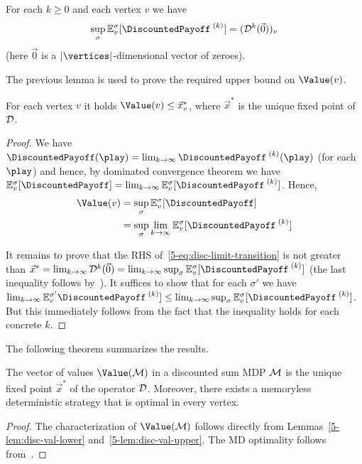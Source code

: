 \begin{lemma}
\label{5-lem:disc-iterates}
For each $k\geq 0$ and each vertex $v$ we have 
$$\sup_{\sigma}\expv^{\sigma}_{v}[\dPayoffStep{k}] = 
(\discOP^k(\vec{0}))_v$$ 
(here $\vec{0}$ is a $|\vertices|$-dimensional vector of zeroes).
\end{lemma}

The previous lemma is used to prove the required upper bound on $\Value(v)$.

\begin{lemma}
\label{5-lem:disc-val-upper}
For each vertex $v$ it holds 
$\Value(v)\leq \vec{x}^*_v$, where $\vec{x}^*$ is the 
unique fixed point of $\mathcal{D}$.
\end{lemma}
\begin{proof}
%
We have $\DiscountedPayoff(\play) = \lim_{k\rightarrow 
\infty}\dPayoffStep{k}(\play)$ (for each $\play$) and hence, by 
dominated 
convergence theorem we have $\expv^\sigma_v[\DiscountedPayoff] = 
\lim_{k\rightarrow 
\infty}\expv^\sigma_v[\dPayoffStep{k}]$. 
Hence,
%
\begin{align}
\Value(v) &= \sup_{\sigma}\expv^\sigma_v[\DiscountedPayoff] \nonumber\\
&= \sup_{\sigma}\lim_{k\rightarrow \infty}\expv^\sigma_v[\dPayoffStep{k}] 
\label{5-eq:disc-limit-transition}
\end{align}

\noindent
It remains to prove that the RHS of~\cref{5-eq:disc-limit-transition} is not 
greater than $\vec{x}^*= \lim_{k\rightarrow 
\infty}\discOP^k(\vec{0})=\lim_{k\rightarrow \infty} 
\sup_{\sigma}\expv^\sigma_v[\dPayoffStep{k}]$ (the last inequality follows 
by~). It suffices to 
show that for each $\sigma'$ we have $\lim_{k\rightarrow 
\infty}\expv^{\sigma'}_v\dPayoffStep{k}] \leq \lim_{k\rightarrow 
\infty}\sup_{\sigma}\expv^\sigma_v[\dPayoffStep{k}]$. But this immediately 
follows from the fact that the inequality holds for each concrete $k$.
\end{proof}

The following theorem summarizes the results.

\begin{theorem}
\label{5-thm:disc-val-char-mem}
The vector of values $\Value(\mdp)$ in a discounted sum MDP $\mathcal{M}$ is the 
unique fixed point $\vec{x}^*$ of the operator $\mathcal{D}$. Moreover, there 
exists a 
memoryless deterministic strategy that is optimal in every vertex.
\end{theorem}
\begin{proof}
The characterization of $\Value(\mdp)$ follows directly from 
Lemmas~\cref{5-lem:disc-val-lower} and~\cref{5-lem:disc-val-upper}. The MD 
optimality follows from~.
\end{proof}

